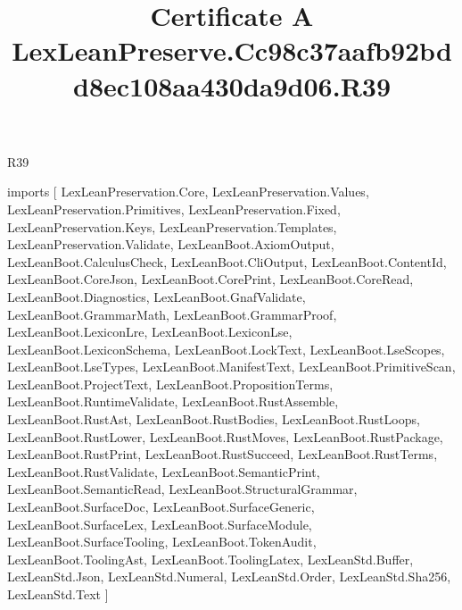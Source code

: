 \begin{lexlean}{R39}
\title{Certificate A LexLeanPreserve.Cc98c37aafb92bdd8ec108aa430da9d06.R39}
\begin{coremodule}
imports [
  LexLeanPreservation.Core,
  LexLeanPreservation.Values,
  LexLeanPreservation.Primitives,
  LexLeanPreservation.Fixed,
  LexLeanPreservation.Keys,
  LexLeanPreservation.Templates,
  LexLeanPreservation.Validate,
  LexLeanBoot.AxiomOutput,
  LexLeanBoot.CalculusCheck,
  LexLeanBoot.CliOutput,
  LexLeanBoot.ContentId,
  LexLeanBoot.CoreJson,
  LexLeanBoot.CorePrint,
  LexLeanBoot.CoreRead,
  LexLeanBoot.Diagnostics,
  LexLeanBoot.GnafValidate,
  LexLeanBoot.GrammarMath,
  LexLeanBoot.GrammarProof,
  LexLeanBoot.LexiconLre,
  LexLeanBoot.LexiconLse,
  LexLeanBoot.LexiconSchema,
  LexLeanBoot.LockText,
  LexLeanBoot.LseScopes,
  LexLeanBoot.LseTypes,
  LexLeanBoot.ManifestText,
  LexLeanBoot.PrimitiveScan,
  LexLeanBoot.ProjectText,
  LexLeanBoot.PropositionTerms,
  LexLeanBoot.RuntimeValidate,
  LexLeanBoot.RustAssemble,
  LexLeanBoot.RustAst,
  LexLeanBoot.RustBodies,
  LexLeanBoot.RustLoops,
  LexLeanBoot.RustLower,
  LexLeanBoot.RustMoves,
  LexLeanBoot.RustPackage,
  LexLeanBoot.RustPrint,
  LexLeanBoot.RustSucceed,
  LexLeanBoot.RustTerms,
  LexLeanBoot.RustValidate,
  LexLeanBoot.SemanticPrint,
  LexLeanBoot.SemanticRead,
  LexLeanBoot.StructuralGrammar,
  LexLeanBoot.SurfaceDoc,
  LexLeanBoot.SurfaceGeneric,
  LexLeanBoot.SurfaceLex,
  LexLeanBoot.SurfaceModule,
  LexLeanBoot.SurfaceTooling,
  LexLeanBoot.TokenAudit,
  LexLeanBoot.ToolingAst,
  LexLeanBoot.ToolingLatex,
  LexLeanStd.Buffer,
  LexLeanStd.Json,
  LexLeanStd.Numeral,
  LexLeanStd.Order,
  LexLeanStd.Sha256,
  LexLeanStd.Text
]


\end{coremodule}
\end{lexlean}
